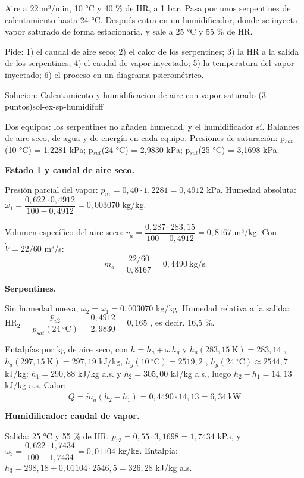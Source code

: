 \documentclass[11pt,a4paper]{article}
\begin{document}
Aire a 22 m³/min, 10 °C y 40 \% de HR, a 1 bar. Pasa por unos serpentines de calentamiento hasta 24 °C. Después entra en un humidificador, donde se inyecta vapor saturado de forma estacionaria, y sale a 25 °C y 55 \% de HR.

Pide: 1) el caudal de aire seco; 2) el calor de los serpentines; 3) la HR a la salida de los serpentines; 4) el caudal de vapor inyectado; 5) la temperatura del vapor inyectado; 6) el proceso en un diagrama psicrométrico.

\begin{ocg}{Solucion: Calentamiento y humidificacion de aire con vapor saturado (3 puntos)}{sol-ex-sp-humidif}{off}
\begin{antesbox}
Dos equipos: los serpentines no añaden humedad, y el humidificador sí. Balances de aire seco, de agua y de energía en cada equipo. Presiones de saturación: p$_{sat}$(10 °C) = 1,2281 kPa; p$_{sat}$(24 °C) = 2,9830 kPa; p$_{sat}$(25 °C) = 3,1698 kPa.
\end{antesbox}

\par\medskip\noindent\textbf{Estado 1 y caudal de aire seco.}\par
Presión parcial del vapor:  $p_{v1} = 0{,}40\cdot 1{,}2281 = 0{,}4912$  kPa. Humedad absoluta:  $\omega_1 = \dfrac{0{,}622\cdot 0{,}4912}{100 - 0{,}4912} = 0{,}003070$  kg/kg.

Volumen específico del aire seco:  $v_a = \dfrac{0{,}287\cdot 283{,}15}{100 - 0{,}4912} = 0{,}8167$  m³/kg. Con  $\dot V = 22/60$  m³/s:  \[\dot m_a = \frac{22/60}{0{,}8167} = 0{,}4490\ \text{kg/s}\]

\par\medskip\noindent\textbf{Serpentines.}\par
Sin humedad nueva,  $\omega_2 = \omega_1 = 0{,}003070$  kg/kg. Humedad relativa a la salida:  $\mathrm{HR}_2 = \dfrac{p_{v2}}{p_{sat}(24\ ^{\circ}\text{C})} = \dfrac{0{,}4912}{2{,}9830} = 0{,}165$ , es decir, 16,5 \%.

Entalpías por kg de aire seco, con  $h = h_a + \omega\,h_g$  y  $h_a(283{,}15\ \text{K}) = 283{,}14$ ,  $h_a(297{,}15\ \text{K}) = 297{,}19$  kJ/kg,  $h_g(10\ ^{\circ}\text{C}) = 2519{,}2$ ,  $h_g(24\ ^{\circ}\text{C}) \approx 2544{,}7$  kJ/kg:  $h_1 = 290{,}88$  kJ/kg a.s. y  $h_2 = 305{,}00$  kJ/kg a.s., luego  $h_2 - h_1 = 14{,}13$  kJ/kg a.s. Calor:  \[\dot Q = \dot m_a(h_2 - h_1) = 0{,}4490\cdot 14{,}13 = 6{,}34\ \text{kW}\]

\par\medskip\noindent\textbf{Humidificador: caudal de vapor.}\par
Salida: 25 °C y 55 \% de HR.  $p_{v3} = 0{,}55\cdot 3{,}1698 = 1{,}7434$  kPa, y  $\omega_3 = \dfrac{0{,}622\cdot 1{,}7434}{100 - 1{,}7434} = 0{,}01104$  kg/kg. Entalpía:  $h_3 = 298{,}18 + 0{,}01104\cdot 2546{,}5 = 326{,}28$  kJ/kg a.s.


\end{ocg}
\end{document}
